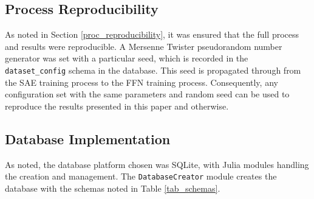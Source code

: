 \documentclass[a4paper,11pt,oneside]{article}
\theoremstyle{plain}
\theoremstyle{definition}
\begin{document}
	\subsection{Process Reproducibility}
	
	As noted in Section \ref{proc_reproducibility}, it was ensured that the full process and results were reproducible. A Mersenne Twister pseudorandom number generator was set with a particular seed, which is recorded in the \texttt{dataset\_config} schema in the database. This seed is propagated through from the SAE training process to the FFN training process. Consequently, any configuration set with the same parameters and random seed can be used to reproduce the results presented in this paper and otherwise.
	
	\subsection{Database Implementation}
	
	As noted, the database platform chosen was SQLite, with Julia modules handling the creation and management. The \texttt{DatabaseCreator} module \citep{DCDatabaseCreator} creates the database with the schemas noted in Table \ref{tab_schemas}.\newline
	
\end{document}
